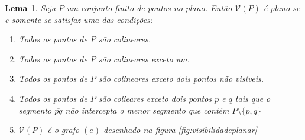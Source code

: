 \documentclass[a4paper]{book}
\newtheorem{lema}{Lema}
\begin{document}
\begin{lema}\cite{planar}\label{visibilidadeplanar}
    Seja $P$ um conjunto finito de pontos no plano. Então $\mathcal V(P)$ é plano se e somente se satisfaz uma das condições:
    \begin{enumerate}[label=(\alph*)]
        \item
            Todos os pontos de $P$ são colineares.
        \item
            Todos os pontos de $P$ são colineares exceto um.
        \item
            Todos os pontos de $P$ são colineares exceto dois pontos não visíveis.
        \item
            Todos os pontos de $P$ são colieares exceto dois pontos $p$ e $q$ tais que o segmento $\overline{pq}$ não intercepta o menor segmento que contém $P\setminus\{p,q\}$
        \item
            $\mathcal V(P)$ é o grafo $(e)$ desenhado na figura \ref{fig:visibilidadeplanar}
    \end{enumerate}
\end{lema}
\end{document}
